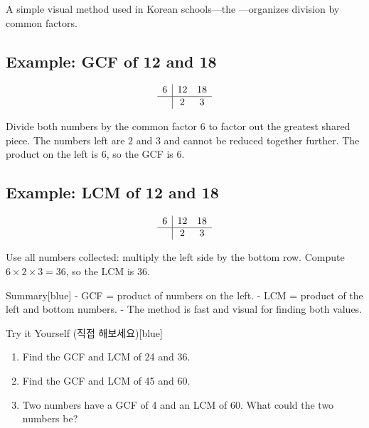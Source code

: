 \documentclass[12pt]{book}
\begin{document}

  A simple visual method used in Korean schools—the —organizes division by common factors.

  \blockquote{}
  \blockquote{}

  \subsection*{Example: GCF of 12 and 18}

  \[
  \begin{array}{r|cc}
  6 & 12 & 18 \\
  \hline
    & 2  & 3
  \end{array}
  \]

  Divide both numbers by the common factor $6$ to factor out the greatest shared piece.  
  The numbers left are $2$ and $3$ and cannot be reduced together further.  
  The product on the left is $6$, so the GCF is $6$.




  \subsection*{Example: LCM of 12 and 18}

  \[
  \begin{array}{r|cc}
  6 & 12 & 18 \\
  \hline
    & 2  & 3
  \end{array}
  \]

  Use all numbers collected: multiply the left side by the bottom row.  
  Compute $6 \times 2 \times 3 = 36$, so the LCM is $36$.


  \begin{flexbox}{Summary}[blue]
  - GCF = product of numbers on the left.  
  - LCM = product of the left and bottom numbers.  
  - The method is fast and visual for finding both values.  
  \end{flexbox}

  \begin{flexbox}{Try it Yourself (직접 해보세요)}[blue]
  \begin{enumerate}
    \item Find the GCF and LCM of 24 and 36. \vspace*{20pt}
    \item Find the GCF and LCM of 45 and 60. \vspace*{20pt}
    \item Two numbers have a GCF of 4 and an LCM of 60. What could the two numbers be? \vspace*{20pt}
  \end{enumerate}
  \end{flexbox}
\end{document}
